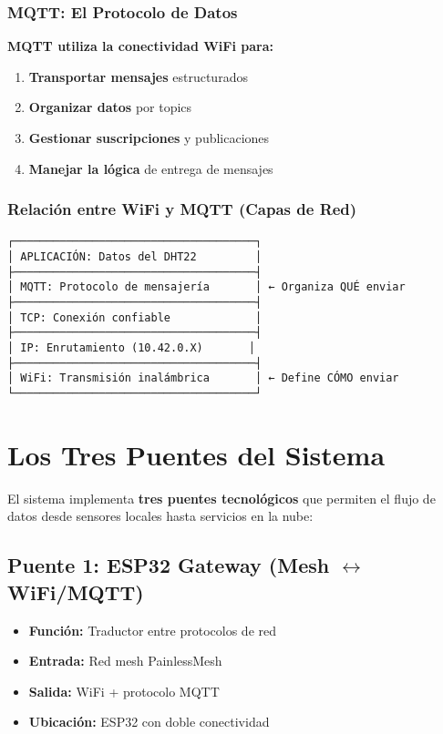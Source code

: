 \documentclass[12pt]{article}
\begin{document}
\subsubsection{MQTT: El Protocolo de Datos}
\textbf{MQTT utiliza la conectividad WiFi para:}
\begin{enumerate}
    \item \textbf{Transportar mensajes} estructurados
    \item \textbf{Organizar datos} por topics
    \item \textbf{Gestionar suscripciones} y publicaciones
    \item \textbf{Manejar la lógica} de entrega de mensajes
\end{enumerate}

\subsubsection{Relación entre WiFi y MQTT (Capas de Red)}
\begin{verbatim}
┌─────────────────────────────────────┐
│ APLICACIÓN: Datos del DHT22         │
├─────────────────────────────────────┤
│ MQTT: Protocolo de mensajería       │ ← Organiza QUÉ enviar
├─────────────────────────────────────┤
│ TCP: Conexión confiable             │
├─────────────────────────────────────┤
│ IP: Enrutamiento (10.42.0.X)       │
├─────────────────────────────────────┤
│ WiFi: Transmisión inalámbrica       │ ← Define CÓMO enviar
└─────────────────────────────────────┘
\end{verbatim}

\section{Los Tres Puentes del Sistema}

El sistema implementa \textbf{tres puentes tecnológicos} que permiten el flujo de datos desde sensores locales hasta servicios en la nube:

\subsection{Puente 1: ESP32 Gateway (Mesh $\leftrightarrow$ WiFi/MQTT)}
\begin{itemize}
    \item \textbf{Función:} Traductor entre protocolos de red
    \item \textbf{Entrada:} Red mesh PainlessMesh
    \item \textbf{Salida:} WiFi + protocolo MQTT
    \item \textbf{Ubicación:} ESP32 con doble conectividad
\end{itemize}
\end{document}
